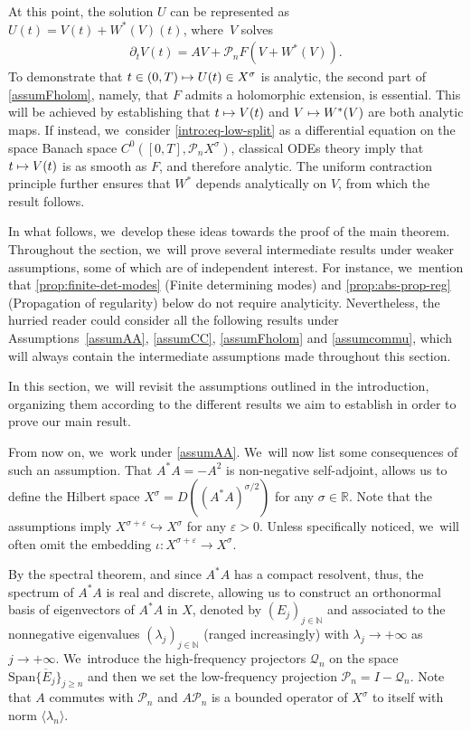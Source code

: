 \documentclass[10pt]{amsart}
\newcommand\mto{\mathchoice{\longmapsto}{\mapsto}{\mapsto}{\mapsto}}
\theoremstyle{definition}
\let\ld\lambda
\let\veps\varepsilon
\newcommand{\R}{\mathbb{R}}
\newcommand{\N}{\mathbb{N}}
\newcommand{\Q}{\mathcal{Q}}
\renewcommand{\P}{\mathcal{P}}
\providecommand{\inn}[1]{\langle#1\rangle}
\begin{document}
At this point, the solution $U$ can be represented as $U(t)=V(t)+W^*(V)(t)$, where~$V$ solves
\begin{align}\label{intro:eq-low-split}
\partial_t V(t)=AV+\P_n F(V+W^*(V)).
\end{align}
To demonstrate that $t\in (0, T)\mto U(t)\in X^\sigma$ is analytic, the second part of \cref{assumFholom}, namely, that $F$ admits a holomorphic extension, is essential. This will be achieved by establishing that $t\mto V(t)$ and $V\mto W^*(V)$ are both analytic maps. If instead, we~consider \eqref{intro:eq-low-split} as a differential equation on the space Banach space $C^0([0, T], \P_n X^\sigma)$, classical ODEs theory imply that $t\mto V(t)$ is as smooth as $F$, and therefore analytic. The uniform contraction principle further ensures that $W^*$ depends analytically on $V$, from which the result follows.

In what follows, we~develop these ideas towards the proof of the main theorem. Throughout the section, we~will prove several intermediate results under weaker assumptions, some of which are of independent interest. For instance, we~mention that \cref{prop:finite-det-modes} (Finite determining modes) and \cref{prop:abs-prop-reg} (Propagation of regularity) below do not require analyticity. Nevertheless, the hurried reader could consider all the following results under Assumptions~\ref{assumAA}, \ref{assumCC}, \ref{assumFholom} and \ref{assumcommu}, which will always contain the intermediate assumptions made throughout this section.

 In this section, we~will revisit the assumptions outlined in the introduction, organizing them according to the different results we aim to establish in order to prove our main result.

From now on, we~work under \cref{assumAA}. We~will now list some consequences of such an assumption. That $A^*A=-A^2$ is non-negative self-adjoint, allows us to define the Hilbert space $X^{\sigma}=D((A^*A)^{\sigma/2})$ for any $\sigma\in\R$. Note that the assumptions imply $X^{\sigma+\veps}\hookrightarrow X^{\sigma} $ for any $\veps>0$. Unless specifically noticed, we~will often omit the embedding $\iota: X^{\sigma+\veps}\to X^{\sigma}$.

By the spectral theorem, and since $A^*A$ has a compact resolvent, thus, the spectrum of $A^*A$ is real and discrete, allowing us to construct an orthonormal basis of eigenvectors of $A^*A$ in $X$, denoted by $(E_j)_{j\in\N}$ and associated to the nonnegative eigenvalues $(\lambda_j)_{j\in \N}$ (ranged increasingly) with $\lambda_j \to+\infty$ as $j\to +\infty$. We~introduce the high-frequency projectors $\Q_n$ on the space $\overline{\text{Span}\{E_j\}_{j\geq n}}$ and then we set the low-frequency projection $\P_n=I-\Q_n$. Note that $A$ commutes with $\P_n$ and $A\P_n$ is a bounded operator of $X^{\sigma}$ to itself with norm $\inn{\ld_n}$.
\end{document}
